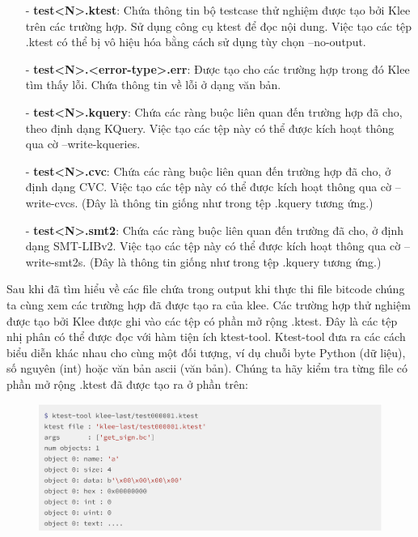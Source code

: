 \documentclass[12pt,a4paper]{report}
\begin{document}
\begin{itemize}
\item[-] \textbf{test<N>.ktest}: Chứa thông tin bộ testcase thử nghiệm được tạo bởi Klee trên các trường hợp. Sử dụng công cụ ktest để đọc nội dung. Việc tạo các tệp .ktest có thể bị vô hiệu hóa bằng cách sử dụng tùy chọn --no-output.
\item[-] \textbf{test<N>.<error-type>.err}: Được tạo cho các trường hợp trong đó Klee tìm thấy lỗi. Chứa thông tin về lỗi ở dạng văn bản.
\item[-] \textbf{test<N>.kquery}: Chứa các ràng buộc liên quan đến trường hợp đã cho, theo định dạng KQuery. Việc tạo các tệp này có thể được kích hoạt thông qua cờ --write-kqueries.
\item[-] \textbf{test<N>.cvc}: Chứa các ràng buộc liên quan đến trường hợp đã cho, ở định dạng CVC. Việc tạo các tệp này có thể được kích hoạt thông qua cờ --write-cvcs. (Đây là thông tin giống như trong tệp .kquery tương ứng.)
\item[-] \textbf{test<N>.smt2}: Chứa các ràng buộc liên quan đến trường đã cho, ở định dạng SMT-LIBv2. Việc tạo các tệp này có thể được kích hoạt thông qua cờ --write-smt2s. (Đây là thông tin giống như trong tệp .kquery tương ứng.)
\end{itemize}

Sau khi đã tìm hiểu về các file chứa trong output khi thực thi file bitcode chúng ta cùng xem các trường hợp đã được tạo ra của klee. Các trường hợp thử nghiệm được tạo bởi Klee được ghi vào các tệp có phần mở rộng .ktest. Đây là các tệp nhị phân có thể được đọc với hàm tiện ích ktest-tool. Ktest-tool đưa ra các cách biểu diễn khác nhau cho cùng một đối tượng, ví dụ chuỗi byte Python (dữ liệu), số nguyên (int) hoặc văn bản ascii (văn bản). Chúng ta hãy kiểm tra từng file có phần mở rộng .ktest đã được tạo ra ở phần trên: \newpage

\begin{figure}[ht]
\begin{center}
\includegraphics[scale=0.25]{hinhanh/test1.png}
\end{center}
\end{figure}
\end{document}
